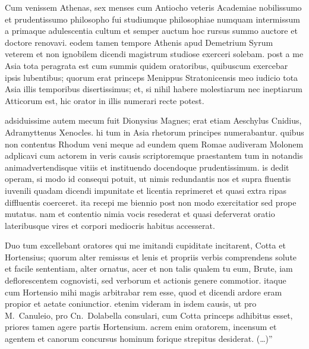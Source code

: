 Cum venissem Athenas, sex menses cum Antiocho veteris Academiae nobilissumo et prudentissumo philosopho fui studiumque philosophiae numquam intermissum a primaque adulescentia cultum et semper auctum hoc rursus summo auctore et doctore renovavi. eodem tamen tempore Athenis apud Demetrium Syrum veterem et non ignobilem dicendi magistrum studiose exerceri solebam. post a me Asia tota peragrata est cum summis quidem oratoribus, quibuscum exercebar ipsis lubentibus; quorum erat princeps Menippus Stratonicensis meo iudicio tota Asia illis temporibus disertissimus; et, si nihil habere molestiarum nec ineptiarum Atticorum est, hic orator in illis numerari recte potest.

adsiduissime autem mecum fuit Dionysius Magnes; erat etiam Aeschylus Cnidius, Adramyttenus Xenocles. hi tum in Asia rhetorum principes numerabantur. quibus non contentus Rhodum veni meque ad eundem quem Romae audiveram Molonem adplicavi cum actorem in veris causis scriptoremque praestantem tum in notandis animadvertendisque vitiis et instituendo docendoque prudentissimum. is dedit operam, si modo id consequi potuit, ut nimis redundantis nos et supra fluentis iuvenili quadam dicendi impunitate et licentia reprimeret et quasi extra ripas diffluentis coerceret. ita recepi me biennio post non modo exercitatior sed prope mutatus. nam et contentio nimia vocis resederat et quasi deferverat oratio lateribusque vires et corpori mediocris habitus accesserat.

Duo tum excellebant oratores qui me imitandi cupiditate incitarent, Cotta et Hortensius; quorum alter remissus et lenis et propriis verbis comprendens solute et facile sententiam, alter ornatus, acer et non talis qualem tu eum, Brute, iam deflorescentem cognovisti, sed verborum et actionis genere commotior. itaque cum Hortensio mihi magis arbitrabar rem esse, quod et dicendi ardore eram propior et aetate coniunctior. etenim videram in isdem causis, ut pro M.~Canuleio, pro Cn.~Dolabella consulari, cum Cotta princeps adhibitus esset, priores tamen agere partis Hortensium. acrem enim oratorem, incensum et agentem et canorum concursus hominum forique strepitus desiderat. (\dots)''
